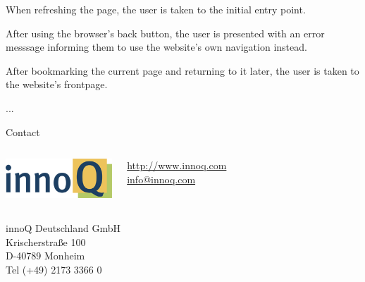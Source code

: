 \documentclass{beamer}
\begin{document}
\begin{frame}
  When refreshing the page, the user is taken to the initial entry point.
\end{frame}

\begin{frame}
  After using the browser's back button, the user is presented with an error messsage informing them to use the website's own navigation instead.
\end{frame}

\begin{frame}
  After bookmarking the current page and returning to it later, the user is taken to the website's frontpage.
\end{frame}

\begin{frame}
  ...
\end{frame}

\begin{frame}{Contact}
  \begin{columns}
    \column{5cm}
    \includegraphics[width=4cm]{images/innoQ-Logo-RGB-72dpi.png}
    \vspace{4mm}
    \column{4.5cm}

    \href{http://www.innoq.com}{http://www.innoq.com} \\
    \href{mailto:info@innoq.com}{info@innoq.com}
  \end{columns}

  innoQ Deutschland GmbH \\
  Krischerstraße 100 \\
  D-40789 Monheim \\
  Tel (+49) 2173 3366 0
\end{frame}
\end{document}
